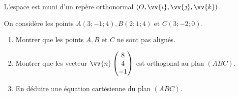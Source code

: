 \begin{question}[topic=espace]
  L'espace est muni d'un repère orthonormal $(O,\vv{\imath}, \vv{\jmath},
  \vv{k})$.

  On considère les points $A(3;-1;4), B(2;1;4)$ et $C(3;-2;0)$.

  \begin{enumerate}
    \item Montrer que les points $A, B$ et $C$ ne sont pas alignés.
    \item Montrer que les vecteur $\vv{n}\begin{pmatrix} 8 \\ 4 \\ -1
      \end{pmatrix}$ est orthogonal au plan $(ABC)$.
    \item En déduire une équation cartésienne du plan $(ABC)$.
  \end{enumerate}
\end{question}
